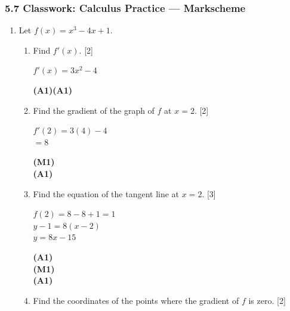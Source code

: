 \documentclass[12pt, twoside]{article}
\begin{document}
\subsubsection*{5.7 Classwork: Calculus Practice --- Markscheme}

\begin{enumerate}[itemsep=0.2cm]

\item Let $f(x) = x^3 - 4x + 1$.

\begin{enumerate}[itemsep=0.3cm]
  \item Find $f'(x)$. \hfill [2]

  \begin{minipage}[t]{0.62\textwidth}
  $f'(x) = 3x^2 - 4$
  \end{minipage}%
  \begin{minipage}[t]{0.35\textwidth}\raggedleft
  \textbf{(A1)(A1)}
  \end{minipage}

  \medskip
  \item Find the gradient of the graph of $f$ at $x = 2$. \hfill [2]

  \begin{minipage}[t]{0.62\textwidth}
  $f'(2) = 3(4) - 4$\\[0.15cm]
  $= 8$
  \end{minipage}%
  \begin{minipage}[t]{0.35\textwidth}\raggedleft
  \textbf{(M1)}\\[0.15cm]
  \textbf{(A1)}
  \end{minipage}

  \medskip
  \item Find the equation of the tangent line at $x = 2$. \hfill [3]

  \begin{minipage}[t]{0.62\textwidth}
  $f(2) = 8 - 8 + 1 = 1$\\[0.15cm]
  $y - 1 = 8(x - 2)$\\[0.15cm]
  $y = 8x - 15$
  \end{minipage}%
  \begin{minipage}[t]{0.35\textwidth}\raggedleft
  \textbf{(A1)}\\[0.15cm]
  \textbf{(M1)}\\[0.15cm]
  \textbf{(A1)}
  \end{minipage}

  \medskip
  \item Find the coordinates of the points where the gradient of $f$ is zero. \hfill [2]


\end{enumerate}
\end{enumerate}
\end{document}
